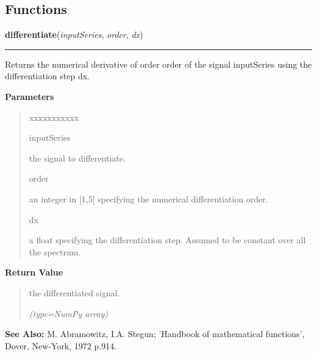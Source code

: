   \subsection{Functions}

    \label{nMOLDYN:Core:Mathematics:differentiate}

    \vspace{0.5ex}

\hspace{.8\funcindent}\begin{boxedminipage}{\funcwidth}

    \raggedright \textbf{differentiate}(\textit{inputSeries}, \textit{order}, \textit{dx})

    \vspace{-1.5ex}

    \rule{\textwidth}{0.5\fboxrule}
\setlength{\parskip}{2ex}
    Returns the numerical derivative of order {\textbar}order{\textbar} of 
    the signal {\textbar}inputSeries{\textbar} using the differentiation 
    step {\textbar}dx{\textbar}.

\setlength{\parskip}{1ex}
      \textbf{Parameters}
      \vspace{-1ex}

      \begin{quote}
        \begin{Ventry}{xxxxxxxxxxx}

          \item[inputSeries]

          the signal to differentiate.

          \item[order]

          an integer in [1,5] specifying the numerical differentiation 
          order.

          \item[dx]

          a float specifying the differentiation step. Assumed to be 
          constant over all the spectrum.

        \end{Ventry}

      \end{quote}

      \textbf{Return Value}
    \vspace{-1ex}

      \begin{quote}
      the differentiated signal.

      {\it (type=NumPy array)}

      \end{quote}

\textbf{See Also:} M. Abramowitz, I.A. Stegun; 'Handbook of mathematical functions', Dover, 
New-York, 1972 p.914.



    \end{boxedminipage}


